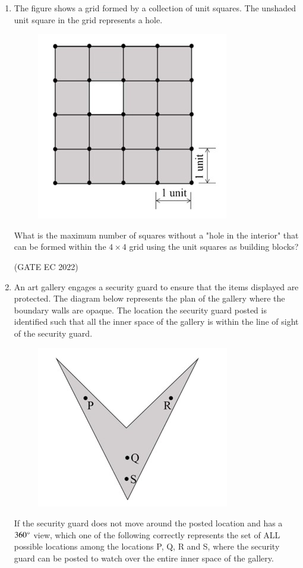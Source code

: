 \documentclass[journal,12pt,onecolumn]{IEEEtran}
\theoremstyle{remark}
\begin{document}
\begin{enumerate}
    \item The figure shows a grid formed by a collection of unit squares. The unshaded unit square in the grid represents a hole.
    \begin{figure}[H]
        \centering
        \includegraphics[width=0.4\columnwidth]{figs/m1.jpg}
        \caption*{}
        \label{fig:m1}
    \end{figure}
    What is the maximum number of squares without a "hole in the interior" that can be formed within the $4 \times 4$ grid using the unit squares as building blocks?

    \hfill{(GATE EC 2022)}
    \begin{enumerate}
    \end{enumerate}

    \item An art gallery engages a security guard to ensure that the items displayed are protected. The diagram below represents the plan of the gallery where the boundary walls are opaque. The location the security guard posted is identified such that all the inner space  of the gallery is within the line of sight of the security guard.
    \begin{figure}[H]
        \centering
        \includegraphics[width=0.3\columnwidth]{figs/m2.jpg}
        \caption*{}
        \label{fig:m2}
    \end{figure}
    If the security guard does not move around the posted location and has a $360\degree$ view, which one of the following correctly represents the set of ALL possible locations among the locations P, Q, R and S, where the security guard can be posted to watch over the entire inner space of the gallery.


\end{enumerate}
\end{document}
